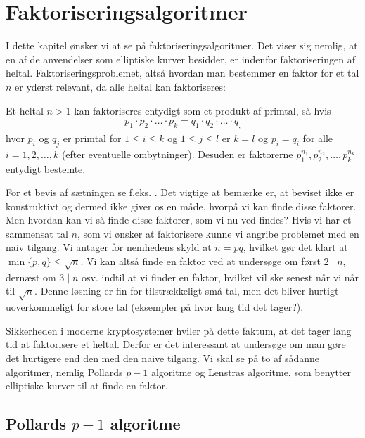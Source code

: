 \chapter{Faktoriseringsalgoritmer}

I dette kapitel ønsker vi at se på faktoriseringsalgoritmer. Det viser sig nemlig, at en af de anvendelser som elliptiske kurver besidder, er indenfor faktoriseringen af heltal. Faktoriseringsproblemet, altså hvordan man bestemmer en faktor for et tal $n$ er yderst relevant, da alle heltal kan faktoriseres:

\begin{theorem}
Et heltal $n > 1$ kan faktoriseres entydigt som et produkt af primtal, så hvis
\begin{align*}
	p_1 \cdot p_2 \cdot \ldots \cdot p_k = q_1 \cdot q_2 \cdot \ldots \cdot q_,
\end{align*}
hvor $p_i$ og $q_j$ er primtal for $1 \leq i \leq k$ og $1 \leq j \leq l$ er $k = l$ og $p_i = q_i$ for alle $i=1, 2, \ldots, k$ (efter eventuelle ombytninger). Desuden er faktorerne $p_{1}^{n_1}, p_{2}^{n_2}, \ldots, p_{k}^{n_k}$ entydigt bestemte.
\end{theorem}

For et bevis af sætningen se f.eks. \cite{Hansen}. Det vigtige at bemærke er, at beviset ikke er konstruktivt og dermed ikke giver os en måde, hvorpå vi kan finde disse faktorer. Men hvordan kan vi så finde disse faktorer, som vi nu ved findes? Hvis vi har et sammensat tal $n$, som vi ønsker at faktorisere kunne vi angribe problemet med en naiv tilgang. Vi antager for nemhedens skyld at $n = pq$, hvilket gør det klart at $\min \{p, q \} \leq \sqrt{n}$. Vi kan altså finde en faktor ved at undersøge om først $2 \mid n$, dernæst om $3 \mid n$ osv. indtil at vi finder en faktor, hvilket vil ske senest når vi når til $\sqrt{n}$. Denne løsning er fin for tilstrækkeligt små tal, men det bliver hurtigt uoverkommeligt for store tal (eksempler på hvor lang tid det tager?). 

Sikkerheden i moderne kryptosystemer hviler på dette faktum, at det tager lang tid at faktorisere et heltal. Derfor er det interessant at undersøge om man gøre det hurtigere end den med den naive tilgang. Vi skal se på to af sådanne algoritmer, nemlig Pollards $p-1$ algoritme og Lenstras algoritme, som benytter elliptiske kurver til at finde en faktor.

\section{Pollards $p-1$ algoritme}

